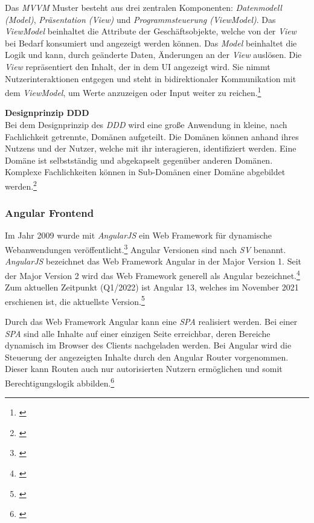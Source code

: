 Das \textit{\gls{MVVM}} Muster besteht aus drei zentralen Komponenten: \textit{Datenmodell (Model)}, \textit{Präsentation (View)} und \textit{Programmsteuerung (ViewModel)}. Das \textit{ViewModel} beinhaltet die Attribute der Geschäftsobjekte, welche von der \textit{View} bei Bedarf konsumiert und angezeigt werden können. Das \textit{Model} beinhaltet die Logik und kann, durch geänderte Daten, Änderungen an der \textit{View} auslösen. Die \textit{View} repräsentiert den Inhalt, der in dem \gls{UI} angezeigt wird. Sie nimmt Nutzerinteraktionen entgegen und steht in bidirektionaler Kommunikation mit dem \textit{ViewModel}, um Werte anzuzeigen oder Input weiter zu reichen.\footnote{\cite[vgl.][95\psq]{Tremp2021}}

\textbf{Designprinzip DDD}\\
Bei dem Designprinzip des \textit{\gls{DDD}} wird eine große Anwendung in kleine, nach Fachlichkeit getrennte, Domänen aufgeteilt. Die Domänen können anhand ihres Nutzens und der Nutzer, welche mit ihr interagieren, identifiziert werden. Eine Domäne ist selbstständig und abgekapselt gegenüber anderen Domänen. Komplexe Fachlichkeiten können in Sub-Domänen einer Domäne abgebildet werden.\footnote{\cite[vgl.][4\psq]{Steyer2020}}

\subsubsection{Angular Frontend}\label{sec:AngularFrontend}

Im Jahr 2009 wurde mit \textit{AngularJS} ein Web Framework für dynamische Webanwendungen veröffentlicht.\footnote{\cite[vgl.][15]{Clow2018}} Angular Versionen sind nach \textit{\gls{SV}} benannt. \textit{AngularJS} bezeichnet das Web Framework Angular in der Major Version 1. Seit der Major Version 2 wird das Web Framework generell als Angular bezeichnet.\footnote{\cite[vgl.][]{Angular2022b}} Zum aktuellen Zeitpunkt (Q1/2022) ist Angular 13, welches im November 2021 erschienen ist, die aktuellste Version.\footnote{\cite[vgl.][]{Thompson2021}}

Durch das Web Framework Angular kann eine \textit{\gls{SPA}} realisiert werden. Bei einer \textit{\gls{SPA}} sind alle Inhalte auf einer einzigen Seite erreichbar, deren Bereiche dynamisch im Browser des Clients nachgeladen werden. Bei Angular wird die Steuerung der angezeigten Inhalte durch den Angular Router vorgenommen. Dieser kann Routen auch nur autorisierten Nutzern ermöglichen und somit Berechtigungslogik abbilden.\footnote{\cite[vgl.][]{Angular2022c}}

